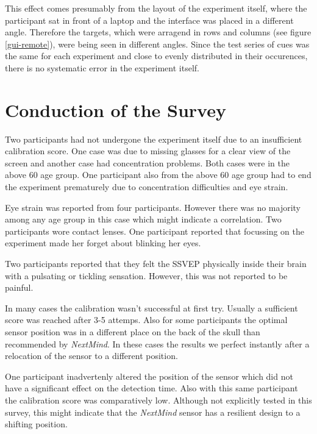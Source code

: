             This effect comes presumably from the layout of the experiment itself, where the participant sat in front of a laptop and the interface was placed in a different angle. Therefore the targets, which were arragend in rows and columns (see figure \ref*{gui-remote}), were being seen in different angles. Since the test series of cues was the same for each experiment and close to evenly distributed in their occurences, there is no systematic error in the experiment itself.
            
        \section{Conduction of the Survey}
            
            Two participants had not undergone the experiment itself due to an insufficient calibration score. One case was due to missing glasses for a clear view of the screen and another case had concentration problems. Both cases were in the above 60 age group.
            One participant also from the above 60 age group had to end the experiment prematurely due to concentration difficulties and eye strain.

            Eye strain was reported from four participants. However there was no majority among any age group in this case which might indicate a correlation. Two participants wore contact lenses. One participant reported that focussing on the experiment made her forget about blinking her eyes.

            Two participants reported that they felt the SSVEP physically inside their brain with a pulsating or tickling sensation. However, this was not reported to be painful.

            In many cases the calibration wasn't successful at first try. Usually a sufficient score was reached after 3-5 attemps. Also for some participants the optimal sensor position was in a different place on the back of the skull than recommended by \textit{NextMind}. In these cases the results we perfect instantly after a relocation of the sensor to a different position.

            One participant inadvertenly altered the position of the sensor which did not have a significant effect on the detection time. Also with this same participant the calibration score was comparatively low. Although not explicitly tested in this survey, this might indicate that the \textit{NextMind} sensor has a resilient design to a shifting position.
     
